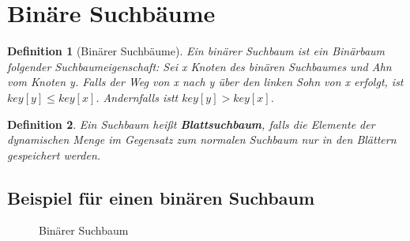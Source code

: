 \documentclass[ngerman,draft,parskip=half*,twoside]{scrreprt}
\theoremstyle{break}
\newtheorem{definition}{Definition}[chapter]
\theoremstyle{nonumberbreak}
\begin{document}
  \section{Binäre Suchbäume}

   \begin{definition}[Binärer Suchbäume]
    Ein binärer Suchbaum ist ein Binärbaum folgender Suchbaumeigenschaft:
    Sei x Knoten des binären Suchbaumes und Ahn vom Knoten y. Falls der Weg von x nach y über den linken Sohn von x erfolgt, ist
    $key[ y ]\leq key[ x ]$. Andernfalls istt $key[ y ]> key[ x ]$.
   \end{definition}

   \begin{definition}
   Ein Suchbaum heißt \textbf{Blattsuchbaum}, falls die Elemente der dynamischen Menge im Gegensatz zum normalen Suchbaum nur in den
   Blättern gespeichert werden.
   \end{definition}

  \subsection{Beispiel für einen binären Suchbaum}
  \begin{figure}[ht]
  \centering  
   \caption{Binärer Suchbaum}
   \label{171103a}
  \end{figure}
\end{document}
